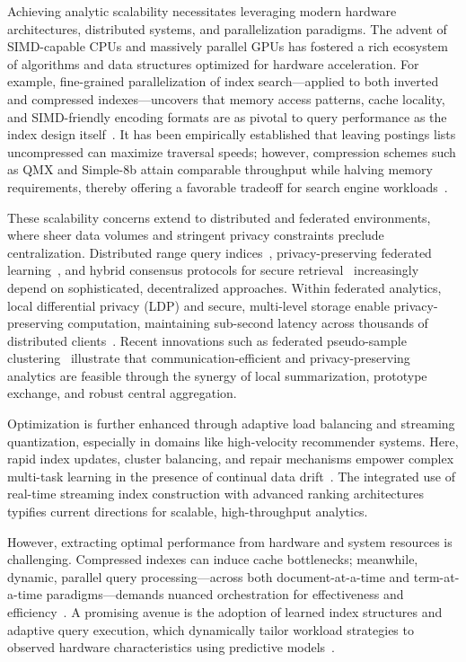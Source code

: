 \documentclass[sigconf]{acmart}
\begin{document}
Achieving analytic scalability necessitates leveraging modern hardware architectures, distributed systems, and parallelization paradigms. The advent of SIMD-capable CPUs and massively parallel GPUs has fostered a rich ecosystem of algorithms and data structures optimized for hardware acceleration. For example, fine-grained parallelization of index search—applied to both inverted and compressed indexes—uncovers that memory access patterns, cache locality, and SIMD-friendly encoding formats are as pivotal to query performance as the index design itself~\cite{ref16,ref18,ref32,ref49,ref94,ref96}. It has been empirically established that leaving postings lists uncompressed can maximize traversal speeds; however, compression schemes such as QMX and Simple-8b attain comparable throughput while halving memory requirements, thereby offering a favorable tradeoff for search engine workloads~\cite{ref94}.

These scalability concerns extend to distributed and federated environments, where sheer data volumes and stringent privacy constraints preclude centralization. Distributed range query indices~\cite{ref39}, privacy-preserving federated learning~\cite{ref15,ref19}, and hybrid consensus protocols for secure retrieval~\cite{ref17} increasingly depend on sophisticated, decentralized approaches. Within federated analytics, local differential privacy (LDP) and secure, multi-level storage enable privacy-preserving computation, maintaining sub-second latency across thousands of distributed clients~\cite{ref19}. Recent innovations such as federated pseudo-sample clustering~\cite{ref20} illustrate that communication-efficient and privacy-preserving analytics are feasible through the synergy of local summarization, prototype exchange, and robust central aggregation.

Optimization is further enhanced through adaptive load balancing and streaming quantization, especially in domains like high-velocity recommender systems. Here, rapid index updates, cluster balancing, and repair mechanisms empower complex multi-task learning in the presence of continual data drift~\cite{ref75}. The integrated use of real-time streaming index construction with advanced ranking architectures typifies current directions for scalable, high-throughput analytics.

However, extracting optimal performance from hardware and system resources is challenging. Compressed indexes can induce cache bottlenecks; meanwhile, dynamic, parallel query processing—across both document-at-a-time and term-at-a-time paradigms—demands nuanced orchestration for effectiveness and efficiency~\cite{ref32,ref94}. A promising avenue is the adoption of learned index structures and adaptive query execution, which dynamically tailor workload strategies to observed hardware characteristics using predictive models~\cite{ref29,ref70,ref97,ref118}.
\end{document}
